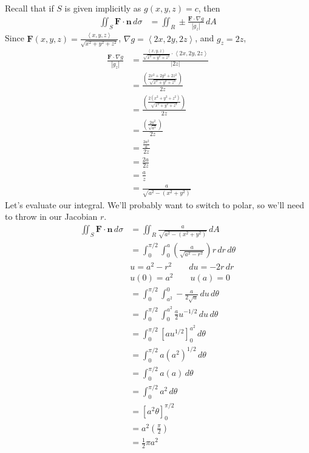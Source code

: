 \documentclass{article}
\newcommand{\lrp}[1]{\left( #1 \right)}
\newcommand{\lra}[1]{\left\langle #1 \right\rangle}
\newcommand{\lrb}[1]{\left[ #1 \right]}
\newcommand{\F}[0]{\mathbf{F}}
\newcommand{\n}[0]{\mathbf{n}}
\begin{document}
Recall that if $S$ is given implicitly as $g(x,y,z)=c$, then
\begin{align*}
    \iint_S \F\cdot \n \,d\sigma &= \iint_R \pm \frac{\F\cdot \nabla g}{\left|g_z\right|}\,dA
\end{align*}
Since $\displaystyle \F(x,y,z)=\frac{\lra{x,y,z}}{\sqrt{x^2+y^2+z^2}}$, $\nabla g = \lra{2x,2y,2z}$, and $g_z=2z$,
\begin{align*}
     \frac{ \F \cdot \nabla g}{\left|g_z\right|}&=\frac{ \frac{\lra{x,y,z}}{\sqrt{x^2+y^2+z^2}}\cdot \lra{2x,2y,2z}}{\left|2z\right|}\\
     &=\frac{ \lrp{\frac{2x^2+2y^2+2z^2}{\sqrt{x^2+y^2+z^2}}}}{2z}\tag{we're in the first octant}\\
     &=\frac{ \lrp{\frac{2(x^2+y^2+z^2)}{\sqrt{x^2+y^2+z^2}}}}{2z}\\
     &=\frac{\lrp{\frac{2a^2}{\sqrt{a^2}}}}{2z}\tag{$x^2+y^2+z^2=a^2$}\\
     &=\frac{ \frac{2a^2}{a}}{2z}\\
     &=\frac{ 2a}{2z}\\
     &=\frac{a}{z}\\
     &=\frac{a}{\sqrt{a^2-(x^2+y^2)}}\tag{$x^2+y^2+z^2=a^2\implies z^2 = a^2-(x^2+y^2)$}
\end{align*}
Let's evaluate our integral. We'll probably want to switch to polar, so we'll need to throw in our Jacobian $r$.
\begin{align*}
    \iint_S \F\cdot\n\,d\sigma &=\iint_R \frac{a}{\sqrt{a^2-(x^2+y^2)}}\,dA\\
    &=\int_0^{\pi/2}\int_0^a \lrp{\frac{a}{\sqrt{a^2 - r^2}}}r\,dr\,d\theta\tag{in polar, $x^2+y^2=r^2$}\\
    &u=a^2-r^2\hspace{2em}du=-2r\,dr\\
    &u(0)=a^2\hspace{2em}u(a)=0\\
    &=\int_0^{\pi/2}\int_{a^2}^0 -\frac{a}{2\sqrt{u}}\,du\,d\theta\\
    &=\int_0^{\pi/2}\int_0^{a^2}\frac{a}{2}u^{-1/2}\,du\,d\theta\tag{we gotta flip the bounds}\\
    &=\int_0^{\pi/2}\lrb{au^{1/2}}_0^{a^2}\,d\theta\\
    &=\int_0^{\pi/2} a(a^2)^{1/2}\,d\theta\\
    &=\int_0^{\pi/2}a(a)\,d\theta\\
    &=\int_0^{\pi/2}a^2\,d\theta\\
    &=\lrb{a^2\theta}_0^{\pi/2}\\
    &=a^2\lrp{\frac{\pi}{2}}\\
    &=\boxed{\frac{1}{2}\pi a^2}
\end{align*}
\end{document}
